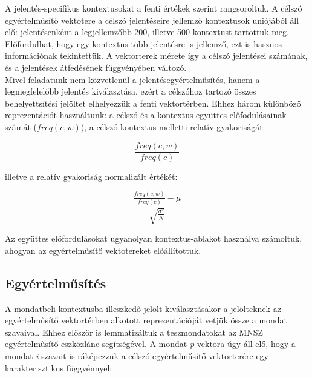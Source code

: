 \documentclass{llncs}
\begin{document}
A jelent\'{e}s-specifikus kontextusokat a fenti \'{e}rt\'{e}kek szerint rangsoroltuk. A c\'{e}lsz\'{o} egy\'{e}rtelm\H{u}s\'{i}t\H{o} vektotere a c\'{e}lsz\'{o} jelent\'{e}seire jellemz\H{o} kontextusok uni\'{o}j\'{a}b\'{o}l \'{a}ll el\H{o}: jelent\'{e}senk\'{e}nt a legjellemz\H{o}bb 200, illetve 500 kontextust tartottuk meg. El\H{o}fordulhat, hogy egy kontextus t\"{o}bb jelent\'{e}sre is jellemz\H{o}, ezt is hasznos inform\'{a}ci\'{o}nak tekintett\"{u}k. A vektorterek m\'{e}rete \'{i}gy a c\'{e}lsz\'{o} jelent\'{e}sei sz\'{a}m\'{a}nak, \'{e}s a jelent\'{e}sek \'{a}tfed\'{e}s\'{e}nek f\"{u}ggv\'{e}ny\'{e}ben v\'{a}ltoz\'{o}. \\

Mivel feladatunk nem k\"{o}zvetlen\"{u}l a jelent\'{e}segy\'{e}rtelm\H{u}s\'{i}t\'{e}s, hanem a legmegfelel\H{o}bb jelent\'{e}s kiv\'{a}laszt\'{a}sa, ez\'{e}rt a c\'{e}lsz\'{o}hoz tartoz\'{o} \"{o}sszes behelyetts\'{i}t\'{e}si jel\"{o}ltet elhelyezz\"{u}k a fenti vektort\'{e}rben. Ehhez h\'{a}rom k\"{u}l\"{o}nb\"{o}z\H{o} reprezent\'{a}ci\'{o}t haszn\'{a}ltunk: a c\'{e}lsz\'{o} \'{e}s a kontextus egy\"{u}ttes el\H{o}fodul\'{a}sainak sz\'{a}m\'{a}t ($ freq(c,w) $),  a c\'{e}lsz\'{o} kontextus melletti relat\'{i}v gyakoris\'{a}g\'{a}t:

\begin{equation}
\frac{freq(c,w)}{freq(c)}
\end{equation}

illetve a relat\'{i}v gyakoris\'{a}g normaliz\'{a}lt \'{e}rt\'{e}k\'{e}t:
 
 \begin{equation}
 \frac{\frac{freq(c,w)}{freq(c)} - \mu}{\sqrt{\frac{\sigma^2}{N}}} 
 \end{equation}
 	
Az egy\"{u}ttes el\H{o}fordul\'{a}sokat ugyanolyan kontextus-ablakot haszn\'{a}lva sz\'{a}moltuk, ahogyan az egy\'{e}rtelm\H{u}s\'{i}t\H{o} vektotereket el\H{o}\'{a}ll\'{i}tottuk.



\subsection{Egy\'{e}rtelm\H{u}s\'{i}t\'{e}s}


A mondatbeli kontextusba illeszked\H{o} jel\"{o}lt kiv\'{a}laszt\'{a}sakor a jel\"{o}lteknek az egy\'{e}rtelm\H{u}s\'{i}t\H{o} vektort\'{e}rben alkotott reprezent\'{a}ci\'{o}j\'{a}t vetj\"{u}k \"{o}ssze a mondat szavaival. Ehhez el\H{o}sz\"{o}r is lemmatiz\'{a}ltuk a teszmondatokat az MNSZ egy\'{e}rtelm\H{u}s\'{i}t\H{o} eszk\"{o}zl\'{a}nc \cite{tagger} seg\'{i}ts\'{e}g\'{e}vel. A mondat \emph{p} vektora \'{u}gy \'{a}ll el\H{o}, hogy a mondat \emph{i} szavait is r\'{a}k\'{e}pezz\"{u}k a c\'{e}lsz\'{o} egy\'{e}rtelm\H{u}s\'{i}t\H{o} vektorter\'{e}re egy karakterisztikus f\"{u}ggv\'{e}nnyel:
\end{document}
